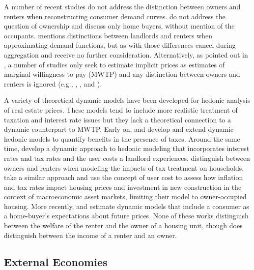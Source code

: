 \documentclass[ecta,nameyear,draft]{econsocart}
\theoremstyle{plain}
\theoremstyle{remark}
\begin{document}
A number of recent studies do not address the distinction between owners and renters when reconstructing consumer demand curves. \cite{bishoptimmins18} do not address the question of ownership and discuss only home buyers, without mention of the occupants. \cite{banzhaf20} mentions distinctions between landlords and renters when approximating demand functions, but as with \cite{freeman14} those differences cancel during aggregation and receive no further consideration. Alternatively, as pointed out in \cite{bishoptimmins18}, a number of studies only seek to estimate implicit prices as estimates of marginal willingness to pay (MWTP) and any distinction between owners and renters is ignored (e.g., \cite{bajari12}, \cite{bui03}, and \cite{kuminoffpope14}).

A variety of theoretical dynamic models have been developed for hedonic analysis of real estate prices. These models tend to include more realistic treatment of taxation and interest rate issues but they lack a theoretical connection to a dynamic counterpart to MWTP. Early on, \cite{niskanen77} and \cite{freeman80} develop and extend dynamic hedonic models to quantify benefits in the presence of taxes. Around the same time, \cite{sonstelie80} develop a dynamic approach to hedonic modeling that incorporates interest rates and tax rates and the user costs a landlord experiences. \cite{hendershott83} distinguish between owners and renters when modeling the impacts of tax treatment on households. \cite{poterba84} take a similar approach and use the concept of user cost to assess how inflation and tax rates impact housing prices and investment in new construction in the context of macroeconomic asset markets, limiting their model to owner-occupied housing. More recently, \cite{bishop11} and \cite{bishop19} estimate dynamic models that include a consumer as a home-buyer's expectations about future prices. None of these works distinguish between the welfare of the renter and the owner of a housing unit, though \cite{hendershott83} does distinguish between the income of a renter and an owner. 





\subsection{External Economies} 
\end{document}
